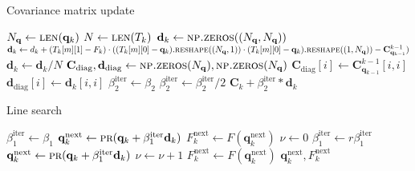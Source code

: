 \begin{algorithm}[H]%
\caption{Covariance matrix update}
\begin{algorithmic}[1]
\State $N_\mathbf{q}\gets \Call{len}{\mathbf{q}_k}$
\State $N\gets \Call{len}{T_k}$
\State $\mathbf{d}_k \gets \Call{np.zeros}{(N_\mathbf{q}, N_\mathbf{q})}$
\State $\mathbf{d}_k \gets d_k + (T_k[m][1]-F_k)\cdot((T_k[m][0]-\mathbf{q}_k).\Call{reshape}{(N_\mathbf{q},1)}\cdot(T_k[m][0]-\mathbf{q}_k).\Call{reshape}{(1,N_\mathbf{q})}-\mathbf{C}_{\mathbf{q}_{k-1}}^{k-1})$
\EndFor
\State $\mathbf{d}_k \gets \mathbf{d}_k/N$
\State $\mathbf{C}_\mathrm{diag}, \mathbf{d}_\mathrm{diag}\gets\Call{np.zeros}{N_\mathbf{q}}, \Call{np.zeros}{N_\mathbf{q}}$
\State $\mathbf{C}_\mathrm{diag}[i]\gets\mathbf{C}_{\mathbf{q}_{k-1}}^{k-1}[i, i]$
\State $\mathbf{d}_\mathrm{diag}[i]\gets\mathbf{d}_k[i, i]$
\EndFor
\State $\beta^\mathrm{iter}_2\gets\beta_2$
\State $\beta^\mathrm{iter}_2 \gets \beta^\mathrm{iter}_2/2$
\EndWhile
\State \Return $\mathbf{C}_k+\beta^\mathrm{iter}_2*\mathbf{d}_k$
\EndFunction
\end{algorithmic}
\end{algorithm}

\begin{algorithm}[H]%
\caption{Line search}
\begin{algorithmic}[1]
\State $\beta^\mathrm{iter}_1 \gets \beta_1$
\State $\mathbf{q}^\mathrm{next}_k \gets \Call{pr}{\mathbf{q}_k+\beta^\mathrm{iter}_1\mathbf{d}_k}$
\State $F^\mathrm{next}_k \gets F(\mathbf{q}^\mathrm{next}_k)$
\State $\nu \gets 0$
\State $\beta^\mathrm{iter}_1 \gets r\beta^\mathrm{iter}_1$
\State $\mathbf{q}^\mathrm{next}_k \gets \Call{pr}{\mathbf{q}_k+\beta^\mathrm{iter}_1\mathbf{d}_k}$
\State $\nu \gets \nu+1$
\State $F^\mathrm{next}_k \gets F(\mathbf{q}^\mathrm{next}_k)$
\EndWhile
\Return $\mathbf{q}^\mathrm{next}_k, F^\mathrm{next}_k$
\EndFunction
\end{algorithmic}
\end{algorithm}

